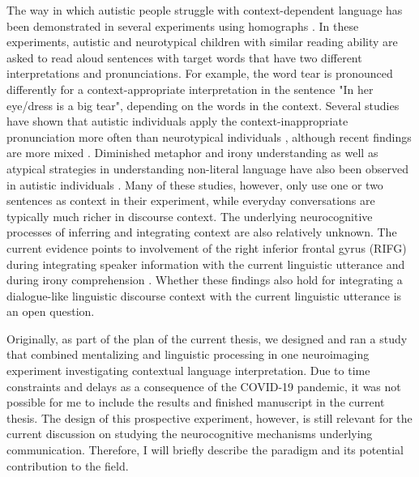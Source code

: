 The way in which autistic people struggle with context-dependent language has been demonstrated in several experiments using homographs \citep{jolliffe1999,happe1997,frith1983,eberhardt2018,hahn2015,brock2008}. In these experiments, autistic and neurotypical children with similar reading ability are asked to read aloud sentences with target words that have two different interpretations and pronunciations. For example, the word tear is pronounced differently for a context-appropriate interpretation in the sentence "In her eye/dress is a big tear", depending on the words in the context. Several studies have shown that autistic individuals apply the context-inappropriate pronunciation more often than neurotypical individuals \citep{jolliffe1999,happe1997,frith1983}, although recent findings are more mixed \citep{eberhardt2018,hahn2015,brock2008}. Diminished metaphor and irony understanding as well as atypical strategies in understanding non-literal language have also been observed in autistic individuals \citep{pexman2011,rundblad2010,deliens2018}. Many of these studies, however, only use one or two sentences as context in their experiment, while everyday conversations are typically much richer in discourse context. The underlying neurocognitive processes of inferring and integrating context are also relatively unknown. The current evidence points to involvement of the right inferior frontal gyrus (RIFG) during integrating speaker information with the current linguistic utterance and during irony comprehension \citep{tesink2009neural,wang2006}. Whether these findings also hold for integrating a dialogue-like linguistic discourse context with the current linguistic utterance is an open question. 

Originally, as part of the plan of the current thesis, we designed and ran a study that combined mentalizing and linguistic processing in one neuroimaging experiment investigating contextual language interpretation. Due to time constraints and delays as a consequence of the COVID-19 pandemic, it was not possible for me to include the results and finished manuscript in the current thesis. The design of this prospective experiment, however, is still relevant for the current discussion on studying the neurocognitive mechanisms underlying communication. Therefore, I will briefly describe the paradigm and its potential contribution to the field.
 
